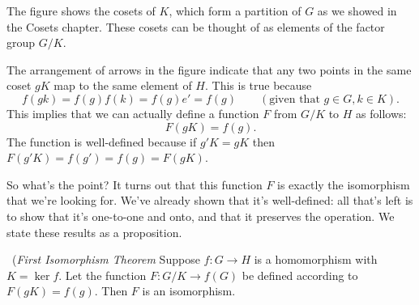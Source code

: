 The figure shows the cosets of $K$, which form a partition of $G$ as we showed in the Cosets chapter. These cosets can be thought of as elements of the factor group $G/K$. 

The arrangement of arrows in the figure indicate that any two points in the same coset $gK$ map to the same element of $H$.  
This is true because
\[ f(gk) = f(g)f(k) = f(g)e' = f(g)\qquad (\text{given that } g \in G, k \in K).\]
This implies that we can actually define a function $F$ from $G/K$ to $H$ as follows:
\[ F(gK) = f(g). \]
The function is well-defined because if $g'K = gK$ then $F(g'K) = f(g') = f(g) = F(gK)$.
 
So what's the point? It turns out that this function $F$ is exactly the isomorphism that we're looking for. We've already shown that it's well-defined: all that's left is to show that it's one-to-one and onto, and that it preserves the operation. We state these results as a proposition.

%  
%
%
%
%
% 
 
 
\begin{thm}~(\emph{First Isomorphism Theorem}\label{FirstIsoTheorem} 
Suppose $f : G \rightarrow H$ is a homomorphism with $K =\ker
f$. Let the function $F: G/K \rightarrow f(G)$
 be defined according to $F(gK) = f(g)$. Then $F$ is an isomorphism. 
\end{thm}
 
